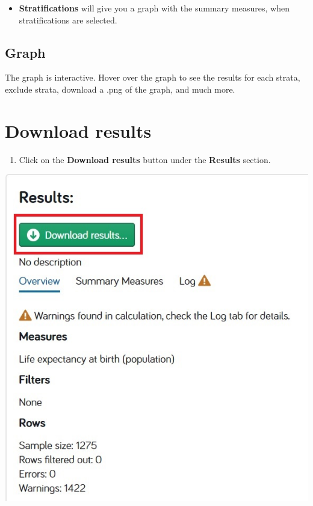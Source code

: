 \documentclass[]{book}
\providecommand{\tightlist}{%
  \setlength{\itemsep}{0pt}\setlength{\parskip}{0pt}}
\begin{document}
\begin{itemize}
\tightlist
\item
  \textbf{Stratifications} will give you a graph with the summary
  measures, when stratifications are selected.
\end{itemize}

\subsection{Graph}\label{graph}

The graph is interactive. Hover over the graph to see the results for
each strata, exclude strata, download a .png of the graph, and much
more.

\section{Download results}\label{download-results}

\begin{enumerate}
\def\labelenumi{\arabic{enumi}.}
\tightlist
\item
  Click on the \textbf{Download results} button under the
  \textbf{Results} section.
\end{enumerate}

\begin{center}\includegraphics{Images/Results-Download} \end{center}
\end{document}
